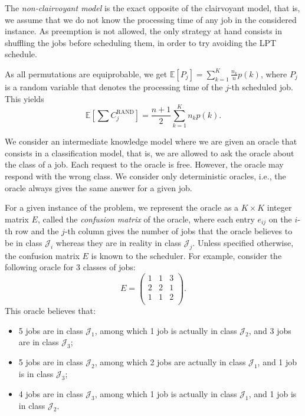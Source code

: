 \documentclass{article}
\newcommand{\E}{\mathbb{E}}
\begin{document}
The \emph{non-clairvoyant model} is the exact opposite of the clairvoyant model,
that is, we assume that we do not know the processing time of any job in the
considered instance.  
As preemption is not allowed, the only strategy at hand consists in shuffling
the jobs before scheduling them, in order to try avoiding the LPT schedule.

As all permutations are equiprobable, we get
\(\E\left[P_j\right]=\sum_{k=1}^{K}\frac{n_k}{n}p(k)\), where \(P_j\) is a
random variable that denotes the processing time of the \(j\)-th scheduled job.  
This yields
\[
    \E\left[\sum C_j^{\text{RAND}}\right]=\frac{n+1}{2}\sum_{k=1}^K n_kp(k).
\]

We consider an intermediate knowledge model where we are given an oracle that
consists in a classification model, that is, we are allowed to ask the oracle
about the class of a job.  
Each request to the oracle is free.  
However, the oracle may respond with the wrong class.  
We consider only deterministic oracles, i.e., the oracle always gives the same
answer for a given job.

For a given instance of the problem, we represent the oracle as a \(K\times K\)
integer matrix \(E\), called the \emph{confusion matrix} of the oracle, where
each entry \(e_{ij}\) on the \(i\)-th row and the \(j\)-th column gives the
number of jobs that the oracle believes to be in class \(\mathcal{J}_i\) whereas
they are in reality in class \(\mathcal{J}_j\).  
Unless specified otherwise, the confusion matrix \(E\) is known to the
scheduler.  
For example, consider the following oracle for 3 classes of jobs:
\[
    E=\begin{pmatrix}
        1 & 1 & 3 \\
        2 & 2 & 1 \\
        1 & 1 & 2 \\
    \end{pmatrix}.
\]
This oracle believes that:
\begin{itemize}
    \item 5 jobs are in class \(\mathcal{J}_1\), among which 1 job is actually
    in class \(\mathcal{J}_2\), and 3 jobs are in class \(\mathcal{J}_3\);
    \item 5 jobs are in class \(\mathcal{J}_2\), among which 2 jobs are actually
    in class \(\mathcal{J}_1\), and 1 job is in class \(\mathcal{J}_3\);
    \item 4 jobs are in class \(\mathcal{J}_3\), among which 1 job is actually
    in class \(\mathcal{J}_1\), and 1 job is in class \(\mathcal{J}_2\).
\end{itemize}
\end{document}
